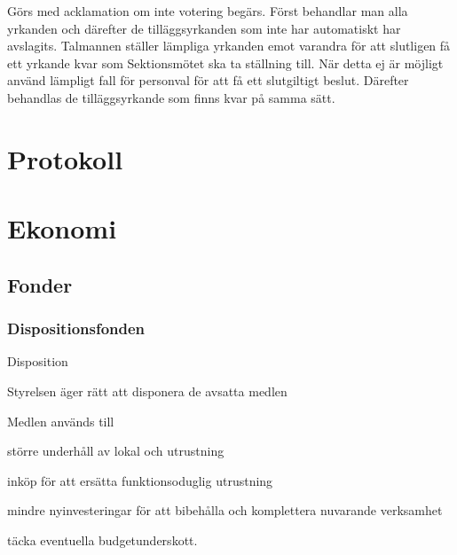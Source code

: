 \documentclass[10pt]{article}
\renewcommand{\thesubsection}{\arabic{section}:\Alph{subsection}}
\begin{document}
Görs med acklamation om inte votering begärs. Först behandlar man alla yrkanden och därefter de tilläggsyrkanden som inte har automatiskt har avslagits. Talmannen ställer lämpliga yrkanden emot varandra för att slutligen få ett yrkande kvar som Sektionsmötet ska ta ställning till. När detta ej är möjligt använd lämpligt fall för personval för att få ett slutgiltigt beslut. Därefter behandlas de tilläggsyrkande som finns kvar på samma sätt.

\section{Protokoll}

\renewcommand*\thesubsection{\arabic{section}:\arabic{subsection}}
\renewcommand*\thesubsubsection
{\arabic{section}:\arabic{subsection}:\Alph{subsubsection}}
\section{Ekonomi}

\subsection{Fonder}

\subsubsection{Dispositionsfonden}
\begin{emptylist}
\item Disposition
    \begin{dashlist}
    \item Styrelsen äger rätt att disponera de avsatta medlen
    \end{dashlist}
\end{emptylist}
\begin{emptylist}
\item Medlen används till
    \begin{dashlist}
    \item större underhåll av lokal och utrustning
    \item inköp för att ersätta funktionsoduglig utrustning
    \item mindre nyinvesteringar för att bibehålla och komplettera nuvarande
        verksamhet
    \item täcka eventuella budgetunderskott.
    \end{dashlist}
\end{emptylist}
\end{document}
